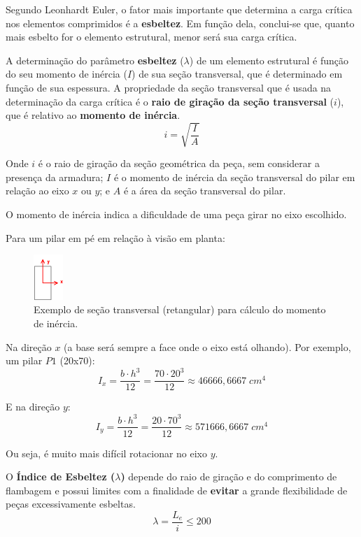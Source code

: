 Segundo Leonhardt Euler, o fator mais importante que determina a carga crítica nos elementos comprimidos é a \textbf{esbeltez}. Em função dela, conclui-se que, quanto mais esbelto for o elemento estrutural, menor será sua carga crítica.

A determinação do parâmetro \textbf{esbeltez} ($\lambda$) de um elemento estrutural é função do seu momento de inércia ($I$) de sua seção transversal, que é determinado em função de sua espessura. A propriedade da seção transversal que é usada na determinação da carga crítica é o \textbf{raio de giração da seção transversal} ($i$), que é relativo ao \textbf{momento de inércia}.
\begin{equation}i=\sqrt{\frac{I}{A}}\end{equation}

Onde $i$ é o raio de giração da seção geométrica da peça, sem considerar a presença da armadura; $I$ é o momento de inércia da seção transversal do pilar em relação ao eixo $x$ ou $y$; e $A$ é a área da seção transversal do pilar.

O momento de inércia indica a dificuldade de uma peça girar no eixo escolhido.

Para um pilar em pé em relação à visão em planta:

\begin{figure}[H]
	\begin{center}
	\caption{Exemplo de seção transversal (retangular) para cálculo do momento de inércia.}
    	\includegraphics[width=0.1\textwidth]{Indice-de-esbeltez/Imagens/Secao-transversal-pilar.png}
	\end{center}
\end{figure}

Na direção $x$ (a base será sempre a face onde o eixo está olhando). Por exemplo, um pilar $P1$ (20x70):
$$I_x=\frac{b\cdot h^3}{12}=\frac{70\cdot{20}^3}{12}\approx46666,6667\;{cm}^4$$

E na direção $y$:
$$I_y=\frac{b\cdot h^3}{12}=\frac{20\cdot{70}^3}{12}\approx571666,6667\;{cm}^4$$

Ou seja, é muito mais difícil rotacionar no eixo $y$.

O \textbf{Índice de Esbeltez ($\lambda$)} depende do raio de giração e do comprimento de flambagem e possui limites com a finalidade de \textbf{evitar} a grande flexibilidade de peças excessivamente esbeltas.
\begin{equation}\lambda=\frac{L_e}{i}\leqslant200\end{equation}

